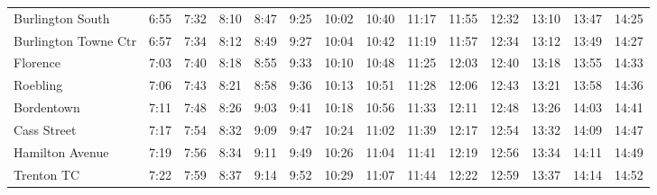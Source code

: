 \begin{center}
\begin{tabular}{@{}lrrrrrrrrrrrrr@{}}
Burlington South & 6:55 & 7:32 & 8:10 & 8:47 & 9:25 & 10:02 & 10:40 & 11:17 & 11:55 & 12:32 & 13:10 & 13:47 & 14:25 \\
Burlington Towne Ctr & 6:57 & 7:34 & 8:12 & 8:49 & 9:27 & 10:04 & 10:42 & 11:19 & 11:57 & 12:34 & 13:12 & 13:49 & 14:27 \\
Florence & 7:03 & 7:40 & 8:18 & 8:55 & 9:33 & 10:10 & 10:48 & 11:25 & 12:03 & 12:40 & 13:18 & 13:55 & 14:33 \\
Roebling & 7:06 & 7:43 & 8:21 & 8:58 & 9:36 & 10:13 & 10:51 & 11:28 & 12:06 & 12:43 & 13:21 & 13:58 & 14:36 \\
Bordentown & 7:11 & 7:48 & 8:26 & 9:03 & 9:41 & 10:18 & 10:56 & 11:33 & 12:11 & 12:48 & 13:26 & 14:03 & 14:41 \\
Cass Street & 7:17 & 7:54 & 8:32 & 9:09 & 9:47 & 10:24 & 11:02 & 11:39 & 12:17 & 12:54 & 13:32 & 14:09 & 14:47 \\
Hamilton Avenue & 7:19 & 7:56 & 8:34 & 9:11 & 9:49 & 10:26 & 11:04 & 11:41 & 12:19 & 12:56 & 13:34 & 14:11 & 14:49 \\
Trenton TC & 7:22 & 7:59 & 8:37 & 9:14 & 9:52 & 10:29 & 11:07 & 11:44 & 12:22 & 12:59 & 13:37 & 14:14 & 14:52 \\
\bottomrule\end{tabular}\end{center}
